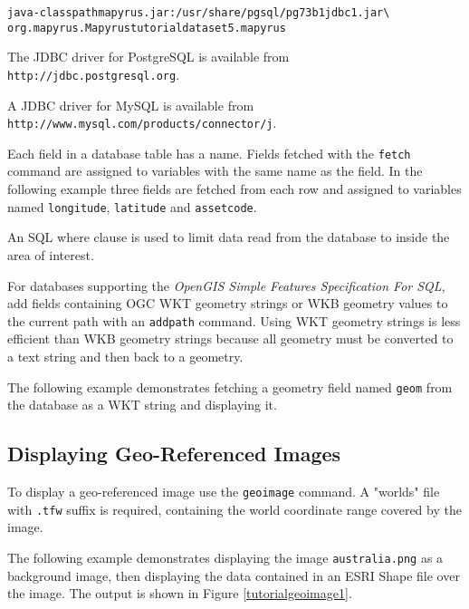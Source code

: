 \begin{alltt}
java -classpath mapyrus.jar:/usr/share/pgsql/pg73b1jdbc1.jar \textbackslash
  org.mapyrus.Mapyrus tutorialdataset5.mapyrus
\end{alltt}

The JDBC driver for PostgreSQL is available from
\texttt{http://jdbc.postgresql.org}.

A JDBC driver for MySQL is available from
\newline
\texttt{http://www.mysql.com/products/connector/j}.

Each field in a database table has a name.
Fields fetched with the
\texttt{fetch}
command are assigned to variables with the same name as the field.
In the following example three fields are fetched from each
row and assigned to variables named
\texttt{longitude}, \texttt{latitude} and \texttt{assetcode}.

An SQL where clause is used to limit data read from
the database to inside the area of interest.



For databases supporting the \textit{OpenGIS Simple Features Specification For
SQL}, add fields containing OGC WKT geometry strings or WKB geometry values
to the current path with an \texttt{addpath} command.  Using WKT geometry
strings is less efficient than WKB geometry strings because all geometry
must be converted to a text string and then back to a geometry.

The following example demonstrates fetching a geometry field named \texttt{geom}
from the database as a WKT string and displaying it.



\subsection{Displaying Geo-Referenced Images}

To display a geo-referenced image use the \texttt{geoimage} command.
A "worlds" file with \texttt{.tfw} suffix is required, containing
the world coordinate range covered by the image.

The following example demonstrates
displaying the image \texttt{australia.png} as a background image,
then displaying the data contained in an ESRI Shape file over the image.
The output is shown in Figure \ref{tutorialgeoimage1}.



